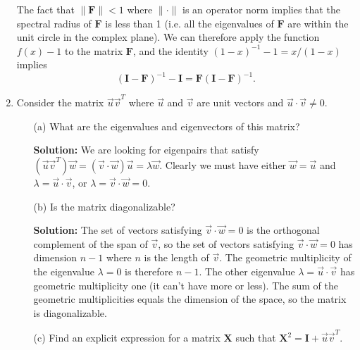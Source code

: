 \documentclass[11pt,fleqn]{article}
\newcommand{\mat}[1]{\mathbf{#1}}
\begin{document}
\begin{enumerate}
The fact that $\|\mat{F}\|<1$ where $\|\cdot\|$ is an operator norm implies that the spectral radius of $\mathbf{F}$ is less than 1 (i.e. all the eigenvalues of $\mathbf{F}$ are within the unit circle in the complex plane).
We can therefore apply the function $f(x) - 1$ to the matrix $\mathbf{F}$, and the identity $(1-x)^{-1}-1=x/(1-x)$ implies
\[(\mat{I}-\mat{F})^{-1} - \mat{I} = \mat{F}(\mat{I}-\mat{F})^{-1}.\]

\item Consider the matrix $\vec{u}\vec{v}^T$ where $\vec{u}$ and $\vec{v}$ are unit vectors and $\vec{u}\cdot\vec{v}\neq0$.
	\begin{itemize}
	\item[(a)] What are the eigenvalues and eigenvectors of this matrix?
	
	{\bf Solution:} We are looking for eigenpairs that satisfy $(\vec{u}\vec{v}^T)\vec{w} = (\vec{v}\cdot\vec{w})\vec{u} = \lambda\vec{w}$. Clearly we must have either $\vec{w}=\vec{u}$ and $\lambda = \vec{u}\cdot\vec{v}$, or $\lambda = \vec{v}\cdot\vec{w}=0$.	
	\item[(b)] Is the matrix diagonalizable?
	
	{\bf Solution:} The set of vectors satisfying  $\vec{v}\cdot\vec{w}=0$ is the orthogonal complement of the span of $\vec{v}$, so the set of vectors satisfying  $\vec{v}\cdot\vec{w}=0$ has dimension $n-1$ where $n$ is the length of $\vec{v}$. The geometric multiplicity of the eigenvalue $\lambda = 0$ is therefore $n-1$. The other eigenvalue $\lambda=\vec{u}\cdot\vec{v}$ has geometric multiplicity one (it can't have more or less). The sum of the geometric multiplicities equals the dimension of the space, so the matrix is diagonalizable.

	\item[(c)] Find an explicit expression for a matrix $\mathbf{X}$ such that $\mathbf{X}^2 = \mathbf{I} + \vec{u}\vec{v}^T$.


\end{itemize}
\end{enumerate}
\end{document}
